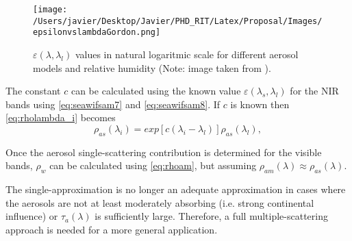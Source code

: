 \begin{figure}[htb]
  \centering
  \texttt{[image: /Users/javier/Desktop/Javier/PHD\_RIT/Latex/Proposal/Images/epsilonvslambdaGordon.png]}
  \caption{$\varepsilon(\lambda,\lambda_l)$ values in natural logaritmic scale for different aerosol models and relative humidity (Note: image taken from \citet{Gordon:1997}). \label{fig:epsilonvslambda} } 
\end{figure}

The constant $c$ can be calculated using the known value $\varepsilon(\lambda_s,\lambda_l)$ for the NIR bands using \autoref{eq:seawifsam7} and \autoref{eq:seawifsam8}. If $c$ is known then \autoref{eq:rholambda_i} becomes
\begin{equation}\label{eq:rholambda_ifinal}
  \rho_{as}(\lambda_i) = exp[c(\lambda_i-\lambda_l)]\rho_{as}(\lambda_l),
\end{equation}

Once the aerosol single-scattering contribution is determined for the visible bands, $\rho_w$ can be calculated using \autoref{eq:rhoam}, but assuming $\rho_{am}(\lambda)\approx\rho_{as}(\lambda)$. 

The single-approximation is no longer an adequate approximation in cases where the aerosols are not at least moderately absorbing (i.e. strong continental influence) or $\tau_a(\lambda)$ is sufficiently large. Therefore, a full multiple-scattering approach is needed for a more general application.



